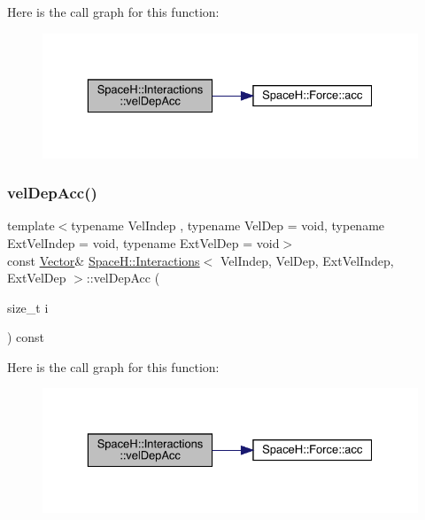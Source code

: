 Here is the call graph for this function\+:
\nopagebreak
\begin{figure}[H]
\begin{center}
\leavevmode
\includegraphics[width=329pt]{class_space_h_1_1_interactions_ade044b9e2a362b35aee04462d70d49ae_cgraph}
\end{center}
\end{figure}
\mbox{\label{class_space_h_1_1_interactions_a7d05ece2dd2961b7f577ff019fad97da}} 
\subsubsection{\texorpdfstring{vel\+Dep\+Acc()}{velDepAcc()}\hspace{0.1cm}{\footnotesize\ttfamily [2/2]}}
{\footnotesize\ttfamily template$<$typename Vel\+Indep , typename Vel\+Dep  = void, typename Ext\+Vel\+Indep  = void, typename Ext\+Vel\+Dep  = void$>$ \\
const \mbox{\hyperlink{class_space_h_1_1_interactions_aaebe228fb44635e85cdb8cc9c10d30d1}{Vector}}\& \mbox{\hyperlink{class_space_h_1_1_interactions}{Space\+H\+::\+Interactions}}$<$ Vel\+Indep, Vel\+Dep, Ext\+Vel\+Indep, Ext\+Vel\+Dep $>$\+::vel\+Dep\+Acc (\begin{DoxyParamCaption}\item[{size\+\_\+t}]{i }\end{DoxyParamCaption}) const\hspace{0.3cm}{\ttfamily [inline]}}

Here is the call graph for this function\+:
\nopagebreak
\begin{figure}[H]
\begin{center}
\leavevmode
\includegraphics[width=329pt]{class_space_h_1_1_interactions_a7d05ece2dd2961b7f577ff019fad97da_cgraph}
\end{center}
\end{figure}
\mbox{\label{class_space_h_1_1_interactions_af9568e6cb38cfa30480c2d267f5cc442}} 
